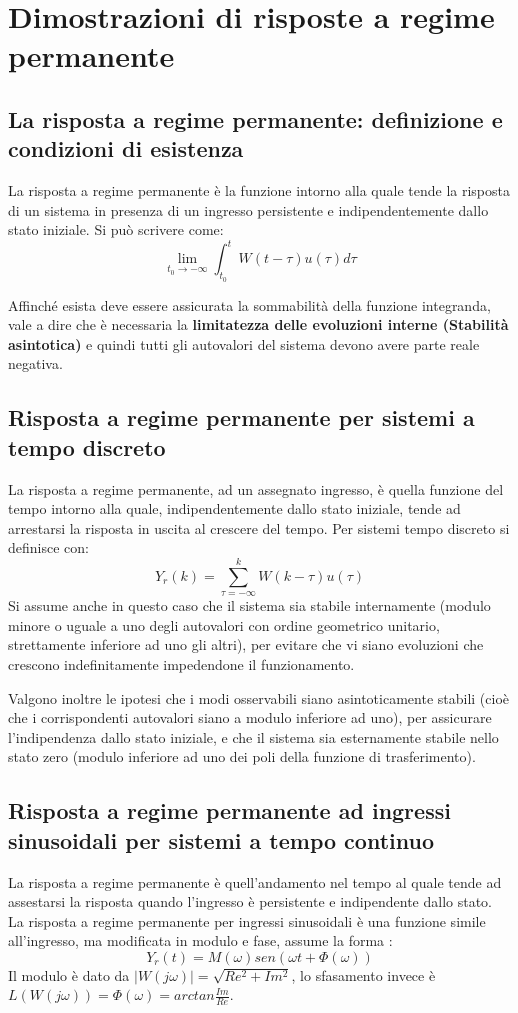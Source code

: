 \documentclass{article}
\begin{document}
\section{Dimostrazioni di risposte a regime permanente}


\subsection{La risposta a regime permanente: definizione e condizioni di esistenza}
La risposta a regime permanente è la funzione intorno alla quale tende la risposta di un sistema
in presenza di un ingresso persistente e indipendentemente dallo stato iniziale.
Si può scrivere come:
\[\lim_ {t_0 \to -\infty} \int_{t_0}^{t} W(t-\tau)u(\tau) d\tau  \]

Affinché esista deve essere assicurata la sommabilità della funzione integranda,
vale a dire che è necessaria la \textbf{limitatezza delle evoluzioni interne (Stabilità asintotica)}
e quindi tutti gli autovalori del sistema devono avere parte reale negativa.



\subsection{Risposta a regime permanente per sistemi a tempo discreto}
La risposta a regime permanente, ad un assegnato ingresso, è quella funzione del tempo intorno alla quale, indipendentemente dallo stato iniziale,
tende ad arrestarsi la risposta in uscita al crescere del tempo.
Per sistemi tempo discreto si definisce con:
\[Y_r(k)=\sum_{\tau =- \infty}^{k} W(k-\tau)u(\tau) \]
Si assume anche in questo caso che il sistema sia stabile internamente (modulo minore o uguale a uno degli autovalori con ordine geometrico unitario,
strettamente inferiore ad uno gli altri), per evitare che vi siano evoluzioni che crescono
indefinitamente impedendone il funzionamento.

Valgono inoltre le ipotesi che i
modi osservabili siano asintoticamente stabili (cioè che i corrispondenti autovalori siano a modulo inferiore ad uno), per assicurare l'indipendenza dallo stato iniziale, e che
il sistema sia esternamente stabile nello stato zero (modulo inferiore ad uno dei
poli della funzione di trasferimento).


\subsection{Risposta a regime permanente ad ingressi sinusoidali per sistemi a tempo continuo}
La risposta a regime permanente è quell'andamento
nel tempo al quale tende ad assestarsi la risposta
quando l'ingresso è persistente e indipendente dallo stato.
La risposta a regime permanente per ingressi sinusoidali
è una funzione simile all'ingresso, ma modificata in modulo e fase, assume la forma :
\[ Y_r(t)=M(\omega)sen(\omega t + \Phi(\omega))\]
Il modulo è dato da $|W(j\omega)|=\sqrt{Re^2+Im^2}$,
lo sfasamento invece è $ L(W(j\omega))=\Phi(\omega)=arctan \frac{Im}{Re}$.
\end{document}
